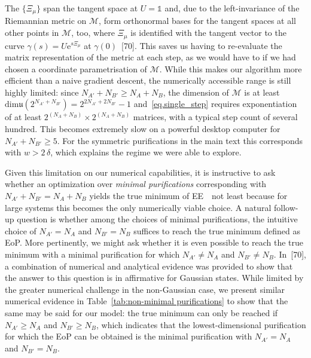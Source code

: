 \documentclass[prl,a4paper,notitlepage,twocolumn,superscriptaddress,longbibliography,reprint]{revtex4-2}
\newcommand{\id}{\mathbb{1}} %
\begin{document}
The $\{\Xi_\mu\}$ span the tangent space at $U=\id$ and, due to the left-invariance of the Riemannian metric on $\mathcal{M}$, form  orthonormal bases for the tangent spaces at all other points in $\mathcal{M}$, too, where $\Xi_\mu$ is identified with the tangent vector to the curve $\gamma(s)=U\mathrm{e}^{s\Xi_\mu}$ at $\gamma(0)$~[70].%
This saves us having to re-evaluate the matrix representation of the metric at each step, as we would have to if we had chosen a coordinate parametrisation of $\mathcal{M}$. While this makes our algorithm more efficient than a naive gradient descent, the numerically accessible range is still highly limited: since $N_{A'}+N_{B'}\geq N_A+N_B$, the dimension of $\mathcal{M}$ is at least $\mathrm{dim}\mathfrak{u}(2^{N_{A'}+N_{B'}})=2^{2N_{A'}+2N_{B'}}-1$ and~\eqref{eq.single_step} requires exponentiation of at least $2^{(N_A+N_B)}\times2^{(N_A+N_B)}$ matrices, with a typical step count of several hundred. This becomes extremely slow on a powerful desktop computer for $N_{A'}+N_{B'}\geq 5$. For the symmetric purifications in the main text this corresponds with $w>2\,\delta$, which explains the regime we were able to explore.

Given this limitation on our numerical capabilities, it is instructive to ask whether an optimization over \textsl{minimal purifications} corresponding with $N_{A'}+N_{B'}=N_A+N_B$ yields the true minimum of EE~\textendash~not least because for large systems this becomes the only numerically viable choice. A natural follow-up question is whether among the choices of minimal purifications, the intuitive choice of $N_{A'}=N_A$ and $N_{B'}=N_B$ suffices to reach the true minimum defined as EoP. More pertinently, we might ask whether it is even possible to reach the true minimum with a minimal purification for which $N_{A'}\neq N_A$ and $N_{B'}\neq N_B$. In~[70], %
a combination of numerical and analytical evidence was provided to show that the answer to this question is in affirmative for Gaussian states. While limited by the greater numerical challenge in the non-Gaussian case, we present similar numerical evidence in Table~\ref{tab:non-minimal purifications} to show that the same may be said for our model: the true minimum can only be reached if $N_{A'}\geq N_{A}$ and $N_{B'}\geq N_{B}$, which indicates that the lowest-dimensional purification for which the EoP can be obtained is the minimal purification with $N_{A'}=N_A$ and $N_{B'}=N_B$.

 
\end{document}

